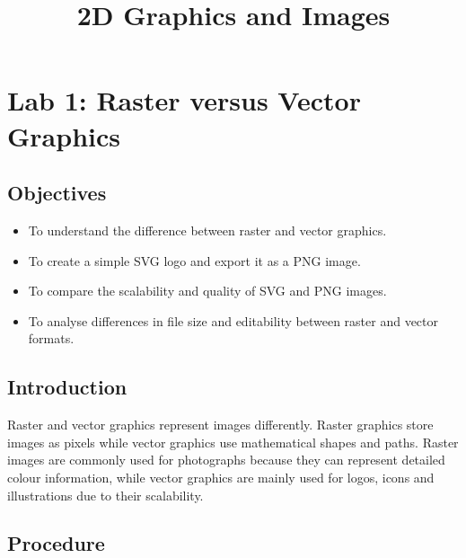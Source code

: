 \documentclass[12pt,a4paper]{article}
\title{\textbf{2D Graphics and Images}}
\begin{document}
\maketitle


\section{Lab 1: Raster versus Vector Graphics}

\subsection{Objectives}

\begin{itemize}
    \item To understand the difference between raster and vector graphics.
    \item To create a simple SVG logo and export it as a PNG image.
    \item To compare the scalability and quality of SVG and PNG images.
    \item To analyse differences in file size and editability between raster and vector formats.
\end{itemize}

\subsection{Introduction}

Raster and vector graphics represent images differently. Raster graphics store images as pixels while vector graphics use mathematical shapes and paths. Raster images are commonly used for photographs because they can represent detailed colour information, while vector graphics are mainly used for logos, icons and illustrations due to their scalability.

\subsection{Procedure}
\end{document}
